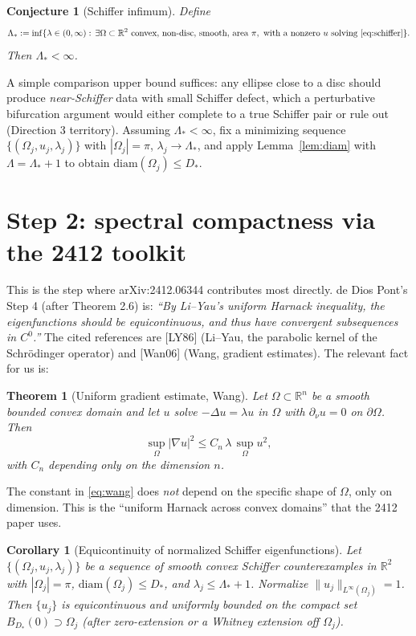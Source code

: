\documentclass[11pt]{article}
\newcommand{\R}{\mathbb{R}}
\newcommand{\Om}{\Omega}
\newcommand{\1}{\mathbf 1}
\newcommand{\nor}{\partial_\nu}
\newcommand{\diam}{\mathrm{diam}}
\newtheorem{cor}[lem]{Corollary}
\newtheorem{thm}[lem]{Theorem}
\newtheorem{conj}[lem]{Conjecture}
\begin{document}
\begin{conj}[Schiffer infimum]\label{conj:inf}
Define
\[
    \Lambda_*:=\inf\{\lambda\in(0,\infty):\,
        \exists\Om\subset\R^2\text{ convex, non-disc, smooth, area }\pi,
        \text{ with a nonzero }u\text{ solving \eqref{eq:schiffer}}\}.
\]
Then $\Lambda_*<\infty$.
\end{conj}

A simple comparison upper bound suffices: any ellipse close to a disc
should produce \emph{near-Schiffer} data with small Schiffer defect,
which a perturbative bifurcation argument would either complete to a
true Schiffer pair or rule out (Direction 3 territory). Assuming
$\Lambda_*<\infty$, fix a minimizing sequence
$\{(\Om_j,u_j,\lambda_j)\}$ with $|\Om_j|=\pi$,
$\lambda_j\to\Lambda_*$, and apply Lemma~\ref{lem:diam} with
$\Lambda=\Lambda_*+1$ to obtain $\diam(\Om_j)\le D_*$.

\section{Step 2: spectral compactness via the 2412 toolkit}

This is the step where arXiv:2412.06344 contributes most directly.
de Dios Pont's Step 4 (after Theorem 2.6) is: \emph{``By Li--Yau's
uniform Harnack inequality, the eigenfunctions should be
equicontinuous, and thus have convergent subsequences in $C^0$.''}
The cited references are [LY86] (Li--Yau, the parabolic kernel of
the Schr\"odinger operator) and [Wan06] (Wang, gradient estimates).
The relevant fact for us is:

\begin{thm}[Uniform gradient estimate, Wang]\label{thm:wang}
Let $\Om\subset\R^n$ be a smooth bounded convex domain and let $u$
solve $-\Delta u=\lambda u$ in $\Om$ with $\nor u=0$ on $\partial\Om$.
Then
\begin{equation}\label{eq:wang}
    \sup_\Om|\nabla u|^2\le C_n\,\lambda\,\sup_\Om u^2,
\end{equation}
with $C_n$ depending only on the dimension $n$.
\end{thm}

The constant in \eqref{eq:wang} does \emph{not} depend on the
specific shape of $\Om$, only on dimension. This is the
``uniform Harnack across convex domains'' that the 2412 paper uses.

\begin{cor}[Equicontinuity of normalized Schiffer eigenfunctions]\label{cor:equi}
Let $\{(\Om_j,u_j,\lambda_j)\}$ be a sequence of smooth convex
Schiffer counterexamples in $\R^2$ with $|\Om_j|=\pi$,
$\diam(\Om_j)\le D_*$, and $\lambda_j\le\Lambda_*+1$. Normalize
$\|u_j\|_{L^\infty(\Om_j)}=1$. Then $\{u_j\}$ is equicontinuous and
uniformly bounded on the compact set $B_{D_*}(0)\supset\Om_j$ (after
zero-extension or a Whitney extension off $\Om_j$).
\end{cor}
\end{document}
